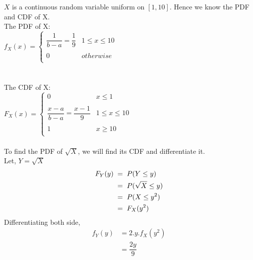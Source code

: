 \documentclass{article}
\begin{document}
\begin{enumerate}
$X$ is a continuous random variable uniform on $[1, 10]$. Hence we know the PDF and CDF of X.\\
The PDF of X:\\
$f_X(x) =  {  \left\{
\begin{array}{ll}
      {\dfrac{1}{b-a} = \dfrac{1}{9}}&  1\leq x\leq 10 \\\\
      0 & otherwise \\
\end{array} 
\right. }$\\\\\\
The CDF of X:\\
$F_X(x) =  {  \left\{
\begin{array}{ll}
      0 & x\leq 1 \\\\
      {\dfrac{x-a}{b-a} = \dfrac{x-1}{9} }&  1\leq x\leq 10 \\\\
      1 & x\geq 10 \\
\end{array} 
\right. }$\\\\
 To find the PDF of $\sqrt{X}$, we will find its CDF and differentiate it.\\
Let, $Y = \sqrt{X}$
\begin{align*}
    F_Y(y)\hspace{1mm} =& \hspace{2mm}P(Y \leq y)\\
    =& \hspace{2mm}P(\sqrt{X} \leq y)\\
    =& \hspace{2mm}P(X \leq y^2)\\
    =& \hspace{2mm}F_X(y^2)
\end{align*}
Differentiating both side,
\begin{align*}
 f_Y(y) &= 2.y.f_X(y^2)\\
 &= \dfrac{2y}{9}
\end{align*}


\end{enumerate}
\end{document}
